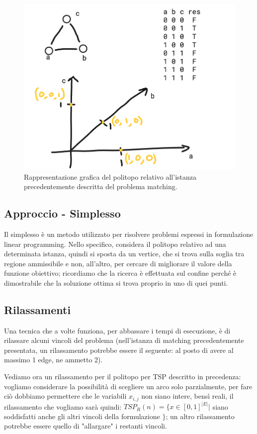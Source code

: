 \documentclass[12pt,a4paper]{article}
\begin{document}
\begin{figure}[h]
	\centering
	\includegraphics[width=0.8\linewidth]{img/polyt}
	\caption{Rappresentazione grafica del politopo relativo all'istanza precedentemente descritta del problema matching.}
	\label{fig:polyt}
\end{figure}

\subsection{Approccio - Simplesso}
Il simplesso è un metodo utilizzato per risolvere problemi espressi in formulazione linear programming. Nello specifico, considera il politopo relativo ad una determinata istanza, quindi si sposta da un vertice, che si trova sulla soglia tra regione ammissibile e non, all'altro, per cercare di migliorare il valore della funzione obiettivo; ricordiamo che la ricerca è effettuata sul confine perché è dimostrabile che la soluzione ottima si trova proprio in uno di quei punti.

\subsection{Rilassamenti}
Una tecnica che a volte funziona, per abbassare i tempi di esecuzione, è di rilassare alcuni vincoli del problema (nell'istanza di matching precedentemente presentata, un rilassamento potrebbe essere il seguente: al posto di avere al massimo 1 edge, ne ammetto 2).

Vediamo ora un rilassamento per il politopo per TSP descritto in precedenza: vogliamo considerare la possibilità di scegliere un arco solo parzialmente, per fare ciò dobbiamo permettere che le variabili $x_{i, j}$ non siano intere, bensì reali, il rilassamento che vogliamo sarà quindi: $TSP_R(n) = \lbrace x \in [0, 1]^{\vert E \vert}  \vert $ siano soddisfatti anche gli altri vincoli della formulazione $\rbrace $; un altro rilassamento potrebbe essere quello di "allargare" i restanti vincoli.
\end{document}

